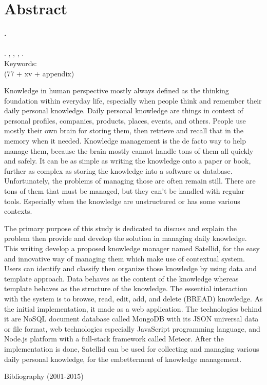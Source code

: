 
\begingroup
\let\clearpage\relax
\let\cleardoublepage\relax

\label{chap:abstract}
\chapter{Abstract}

\textbf{\myName.} \myNPM \\
\textbf{\myTitle} \\
\textbf{\myThesisType}. \myDepartmentLong, \myFacultyLong, \myUni, \myYear. \\
Keywords: \myKeywords \\
(77 + xv + appendix)

\hfill

\singlespacing

Knowledge in human perspective mostly always defined as the thinking foundation within everyday life,
especially when people think and remember their daily personal knowledge.
Daily personal knowledge are things in context of personal profiles, companies, products, places, events, and others.
People use mostly their own brain for storing them, then retrieve and recall that in the memory when it needed.
Knowledge management is the de facto way to help manage them, because the brain mostly cannot handle tons of them all quickly and safely.
It can be as simple as writing the knowledge onto a paper or book, further as complex as storing the knowledge into a software or database.
Unfortunately, the problems of managing those are often remain still.
There are tons of them that must be managed, but they can’t be handled with regular tools.
Especially when the knowledge are unstructured or has some various contexts.

The primary purpose of this study is dedicated to discuss and explain the problem then provide and develop the solution in managing daily knowledge.
This writing develop a proposed knowledge manager named Satellid, for the easy and innovative way of managing them which make use of contextual system.
Users can identify and classify then organize those knowledge by using data and template approach.
Data behaves as the content of the knowledge whereas template behaves as the structure of the knowledge.
The essential interaction with the system is to browse, read, edit, add, and delete (BREAD) knowledge.
As the initial implementation, it made as a web application.
The technologies behind it are NoSQL document database called MongoDB with its JSON universal data or file format, web technologies especially JavaScript programming language, and Node.js platform with a full-stack framework called Meteor.
After the implementation is done, Satellid can be used for collecting and managing various daily personal knowledge, for the embetterment of knowledge management.

\onehalfspacing

\hfill


\noindent Bibliography (2001-2015)



\endgroup

\vfill
